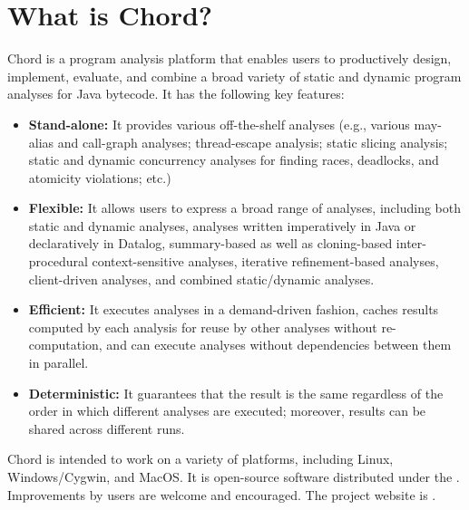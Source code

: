 \chapter{What is Chord?}
\label{chap:whatis-chord}

Chord is a program analysis platform that enables users to productively design,
implement, evaluate, and combine a broad variety of static and dynamic program
analyses for Java bytecode. It has the following key features:

\begin{itemize}
\item

{\bf Stand-alone:} It provides various off-the-shelf analyses (e.g., various
may-alias and call-graph analyses; thread-escape analysis; static slicing
analysis; static and dynamic concurrency analyses for finding races, deadlocks,
and atomicity violations; etc.)

\item

{\bf Flexible:} It allows users to express a broad range of analyses, including
both static and dynamic analyses, analyses written imperatively in Java or
declaratively in Datalog, summary-based as well as cloning-based
inter-procedural context-sensitive analyses, iterative refinement-based
analyses, client-driven analyses, and combined static/dynamic analyses.

\item

{\bf Efficient:} It executes analyses in a demand-driven fashion, caches results
computed by each analysis for reuse by other analyses without re-computation,
and can execute analyses without dependencies between them in parallel.

\item

{\bf Deterministic:} It guarantees that the result is the same regardless of the
order in which different analyses are executed; moreover, results can be shared
across different runs.
\end{itemize}

Chord is intended to work on a variety of platforms, including Linux,
Windows/Cygwin, and MacOS.  It is open-source software distributed under
the \bsdlicense.  Improvements by users are welcome and encouraged.  The project
website is \chordweb.
